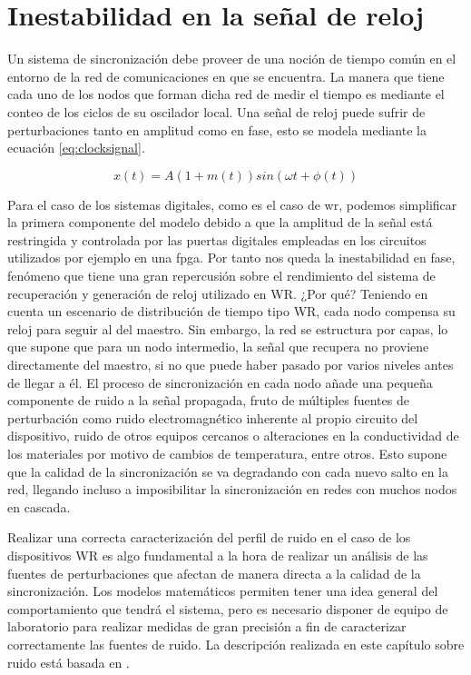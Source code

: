 \chapter{Inestabilidad en la señal de reloj}

Un sistema de sincronización debe proveer de una noción de tiempo común en el 
entorno de la red de comunicaciones en que se encuentra. La manera que tiene 
cada uno de los nodos que forman dicha red de medir el tiempo es mediante el 
conteo de los ciclos de su oscilador local. Una señal de reloj puede sufrir de 
perturbaciones tanto en amplitud como en fase, esto se modela mediante la 
ecuación \ref*{eq:clocksignal}.

\begin{equation}\label{eq:clocksignal}
x(t) = A(1+m(t))sin(\omega t + \phi (t))
\end{equation}

Para el caso de los sistemas digitales, como es el caso de \gls{wr}, podemos 
simplificar la primera componente del modelo debido a que la amplitud de la 
señal está restringida y controlada por las puertas digitales empleadas en los 
circuitos utilizados por ejemplo en una \gls{fpga}. Por tanto nos queda la 
inestabilidad en fase, fenómeno que tiene una gran repercusión sobre el 
rendimiento del sistema de recuperación y generación de reloj utilizado en WR. 
¿Por qué? Teniendo en cuenta un escenario de distribución de tiempo tipo WR, 
cada nodo compensa su reloj para seguir al del maestro. Sin embargo, la red se 
estructura por capas, lo que supone que para un nodo intermedio, la señal que 
recupera no proviene directamente del maestro, si no que puede haber pasado por 
varios niveles antes de llegar a él. El proceso de sincronización en cada nodo 
añade una pequeña componente de ruido a la señal propagada, fruto de múltiples 
fuentes de perturbación como ruido electromagnético inherente al propio 
circuito del dispositivo, ruido de otros equipos cercanos o alteraciones en la 
conductividad de los materiales por motivo de cambios de temperatura, entre 
otros. Esto supone que la calidad de la sincronización se va degradando con 
cada nuevo salto en la red, llegando incluso a imposibilitar la sincronización 
en redes con muchos nodos en cascada.

Realizar una correcta caracterización del perfil de ruido en el caso de los 
dispositivos WR es algo fundamental a la hora de realizar un análisis de las 
fuentes de perturbaciones que afectan de manera directa a la calidad de la 
sincronización. Los modelos matemáticos permiten tener una idea general del 
comportamiento que tendrá el sistema, pero es necesario disponer de equipo de 
laboratorio para realizar medidas de gran precisión a fin de caracterizar 
correctamente las fuentes de ruido. La descripción realizada en este capítulo 
sobre ruido está basada en \cite{Wlostowski2011}.

